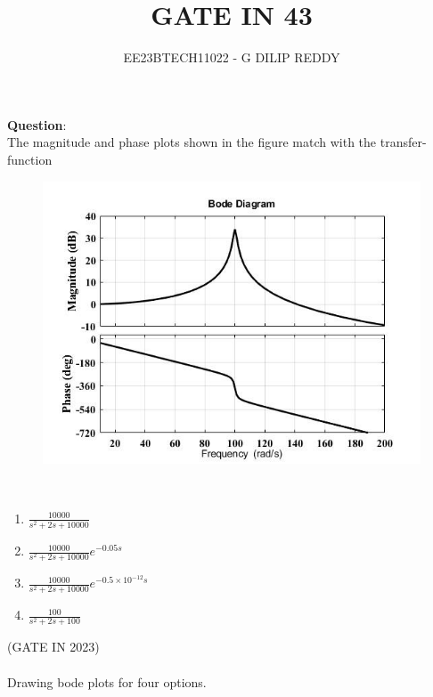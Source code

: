 \documentclass[journal,12pt,onecolumn]{IEEEtran}
\theoremstyle{remark}
\begin{document}

\vspace{3cm}

\title{GATE IN 43}
\author{EE23BTECH11022 - G DILIP REDDY}
\maketitle

\bigskip

\renewcommand{\thefigure}{\arabic{figure}}
\renewcommand{\thetable}{\arabic{table}}
\textbf{Question}:\\
The magnitude and phase plots shown in the figure match with the transfer-
function
\begin{figure}[h]
    \centering
    \includegraphics[width=\columnwidth]{figs/question.png}
\end{figure}\\
\renewcommand{\labelenumi}{\alph{enumi})}
\begin{enumerate}
\item $\frac{10000}{s^2+2s+10000}$\\
\item $\frac{10000}{s^2+2s+10000}e^{-0.05s}$\\
\item $\frac{10000}{s^2+2s+10000}e^{-0.5\times10^{-12}s}$\\
\item $\frac{100}{s^2+2s+100}$
\end{enumerate}
\hfill{(GATE IN 2023)}
\\\\
\solution
Drawing bode plots for four options.\\
\end{document}
